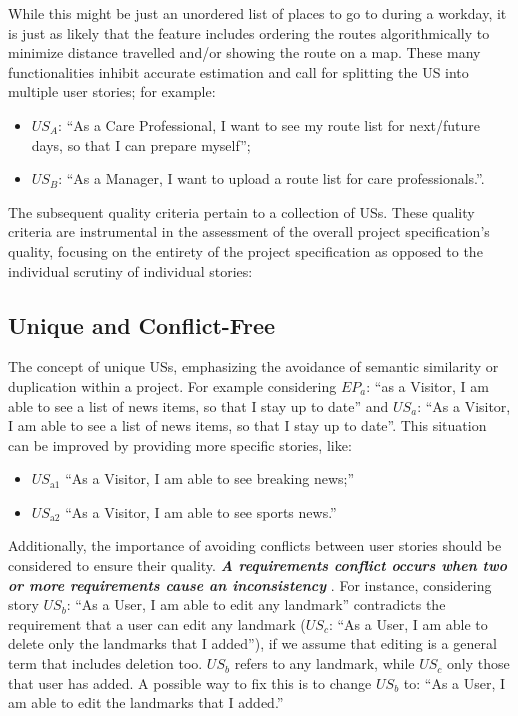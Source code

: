 While this might be just an unordered list of places to go to during a workday, it is just as likely that the feature includes ordering the routes algorithmically to minimize distance travelled and/or showing the route on a map. These many functionalities inhibit accurate estimation and call for splitting the US into multiple user stories; for example:
\begin{itemize}
\item $US_A$: \enquote{As a Care Professional, I want to see my route list for next/future days, so that I can prepare myself};
\item $US_B$: \enquote{As a Manager, I want to upload a route list for care professionals.}.
\end{itemize}

The subsequent quality criteria pertain to a collection of USs. These quality criteria are instrumental in the assessment of the overall project specification's quality, focusing on the entirety of the project specification as opposed to the individual scrutiny of individual stories:
\subsection*{\normalsize{Unique and Conflict-Free}}
The concept of unique USs, emphasizing the avoidance of semantic similarity or duplication within a project. For example considering $EP_a$: \enquote{as a Visitor, I am able to see a list of news items, so that I stay up to date} and $US_a$: \enquote{As a Visitor, I am able to see a list of news items, so that I stay up to date}. This situation can be improved by providing more specific stories, like:
\begin{itemize}
\item $US_{\text{a1}}$ \enquote{As a Visitor, I am able to see breaking news;}
\item $US_{\text{a2}}$ \enquote{As a Visitor, I am able to see sports news.}
\end{itemize}
Additionally, the importance of avoiding conflicts between user stories should be considered to ensure their quality. \textbf{\emph{A requirements conflict occurs when two or more requirements cause an inconsistency}} \cite{paja2013managing} \cite{robinson1989integrating}. For instance, considering story $US_b$: \enquote{As a User, I am able to edit any landmark} contradicts the requirement that a user can edit any landmark ($US_c$: \enquote{As a User, I am able to delete only the landmarks that I added}), if we assume that editing is a general term that includes deletion too. $US_b$ refers to any landmark, while  $US_c$ only those that user has added. A possible way to fix this is to change $US_b$ to: \enquote{As a User, I am able to edit the landmarks that I added.} \cite{lucassen2016improving}

